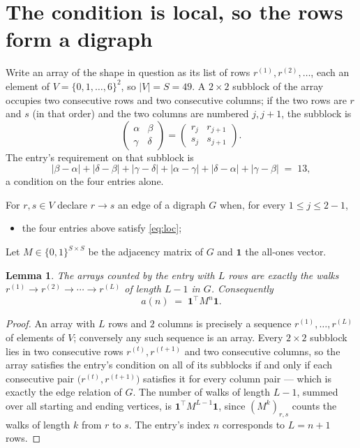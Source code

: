 \documentclass[11pt,a4paper]{article}
\theoremstyle{plain}
\newtheorem{lemma}[theorem]{Lemma}
\theoremstyle{definition}
\begin{document}
\section{The condition is local, so the rows form a digraph}

Write an array of the shape in question as its list of rows
$r^{(1)},r^{(2)},\dots$, each an element of
$V=\{0,1,\dots,6\}^{2}$, so $|V|=S=49$. A $2\times2$ subblock of the array
occupies two consecutive rows and two consecutive columns; if the two rows are $r$
and $s$ (in that order) and the two columns are numbered $j,j+1$,
the subblock is
\[
\begin{pmatrix}\alpha&\beta\\\gamma&\delta\end{pmatrix}=\begin{pmatrix}r_j&r_{j+1}\\s_j&s_{j+1}\end{pmatrix}.
\]
The entry's requirement on that subblock is
\begin{equation}\label{eq:loc}
|\beta-\alpha|+|\delta-\beta|+|\gamma-\delta|+|\alpha-\gamma|+|\delta-\alpha|+|\gamma-\beta|\;=\;13,
\end{equation}
a condition on the four entries alone.

For $r,s\in V$ declare $r\to s$ an edge of a digraph $G$ when, for every
$1\le j\le 2-1$,
\begin{itemize}
\item the four entries above satisfy \eqref{eq:loc};

\end{itemize}
Let $M\in\{0,1\}^{S\times S}$ be the adjacency matrix of $G$ and $\mathbf{1}$ the
all-ones vector.

\begin{lemma}\label{lem:walk}
The arrays counted by the entry with $L$ rows are exactly the walks
$r^{(1)}\to r^{(2)}\to\cdots\to r^{(L)}$ of length $L-1$ in $G$. Consequently
\[
a(n)\;=\;\mathbf{1}^{\!\top}M^{n}\mathbf{1} .
\]
\end{lemma}

\begin{proof}
An array with $L$ rows and $2$ columns is precisely a sequence
$r^{(1)},\dots,r^{(L)}$ of elements of $V$; conversely any such sequence is an array.
Every $2\times2$ subblock lies in two consecutive rows $r^{(t)},r^{(t+1)}$ and two
consecutive columns, so the array satisfies the entry's condition on all of its subblocks
if and only if each consecutive pair $\bigl(r^{(t)},r^{(t+1)}\bigr)$ satisfies it for
every column pair --- which is exactly the edge relation of $G$. The number of walks of
length $L-1$, summed over all starting and ending vertices, is
$\mathbf{1}^{\!\top}M^{L-1}\mathbf{1}$, since $(M^{k})_{r,s}$ counts the walks of
length $k$ from $r$ to $s$. The entry's index $n$ corresponds to $L=n+1$ rows.
\end{proof}
\end{document}
